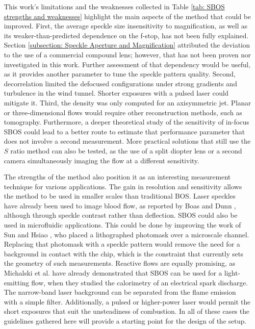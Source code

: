 This work's limitations and the weaknesses collected in Table \ref{tab: SBOS strengths and weaknesses} highlight the main aspects of the method that could be improved. First, the average speckle size insensitivity to magnification, as well as its weaker-than-predicted dependence on the f-stop, has not been fully explained. Section \ref{subsection: Speckle Aperture and Magnification} attributed the deviation to the use of a commercial compound lens; however, that has not been proven nor investigated in this work. Further assessment of that dependency would be useful, as it provides another parameter to tune the speckle pattern quality. Second, decorrelation limited the defocused configurations under strong gradients and turbulence in the wind tunnel. Shorter exposures with a pulsed laser could mitigate it. Third, the density was only computed for an axisymmetric jet. Planar or three-dimensional flows would require other reconstruction methods, such as tomography. Furthermore, a deeper theoretical study of the sensitivity of in-focus SBOS could lead to a better route to estimate that performance parameter that does not involve a second measurement. More practical solutions that still use the $S$ ratio method can also be tested, as the use of a split diopter lens or a second camera simultaneously imaging the flow at a different sensitivity.

The strengths of the method also position it as an interesting measurement technique for various applications. The gain in resolution and sensitivity allows the method to be used in smaller scales than traditional BOS. Laser speckles have already been used to image blood flow, as reported by Boas and Dunn \cite{Boas&Dunn2010}, although through speckle contrast rather than deflection. SBOS could also be used in microfluidic applications. This could be done by improving the work of Sun and Hsiao \cite{Sun&Hsiao2014}, who placed a lithographed photomask over a microscale channel. Replacing that photomask with a speckle pattern would remove the need for a background in contact with the chip, which is the constraint that currently sets the geometry of such measurements. Reactive flows are equally promising, as Michalski et al. \cite{Michalski2018} have already demonstrated that SBOS can be used for a light-emitting flow, when they studied the calorimetry of an electrical spark discharge. The narrow-band laser background can be separated from the flame emission with a simple filter. Additionally, a pulsed or higher-power laser would permit the short exposures that suit the unsteadiness of combustion. In all of these cases the guidelines gathered here will provide a starting point for the design of the setup.
